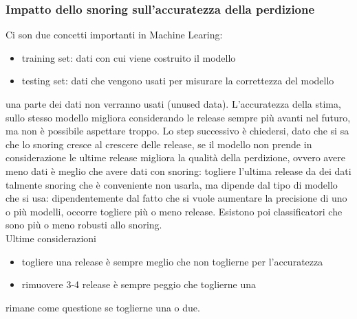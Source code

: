 \documentclass{article}
\begin{document}
\subsubsection{Impatto dello snoring sull'accuratezza della perdizione}
Ci son due concetti importanti in Machine Learing:
\begin{itemize}
\item training set: dati con cui viene costruito il modello
\item testing set: dati che vengono usati per misurare la correttezza del modello
\end{itemize}
una parte dei dati non verranno usati (unused data). L'accuratezza della stima, sullo stesso modello migliora considerando le release sempre più avanti nel futuro, ma non è possibile aspettare troppo. Lo step successivo è chiedersi, dato che si sa che lo snoring cresce al crescere delle release, se il modello non prende in considerazione le ultime release migliora la qualità della perdizione, ovvero avere meno dati è meglio che avere dati con snoring: togliere l'ultima release da dei dati talmente snoring che è conveniente non usarla, ma dipende dal tipo di modello che si usa: dipendentemente dal fatto che si vuole aumentare la precisione di uno o più modelli, occorre togliere più o meno release. Esistono poi classificatori che sono più o meno robusti allo snoring.\\ Ultime considerazioni
\begin{itemize}
\item togliere una release è sempre meglio che non toglierne per l'accuratezza
\item rimuovere 3-4 release è sempre peggio che toglierne una
\end{itemize}
rimane come questione se toglierne una o due.
\end{document}
